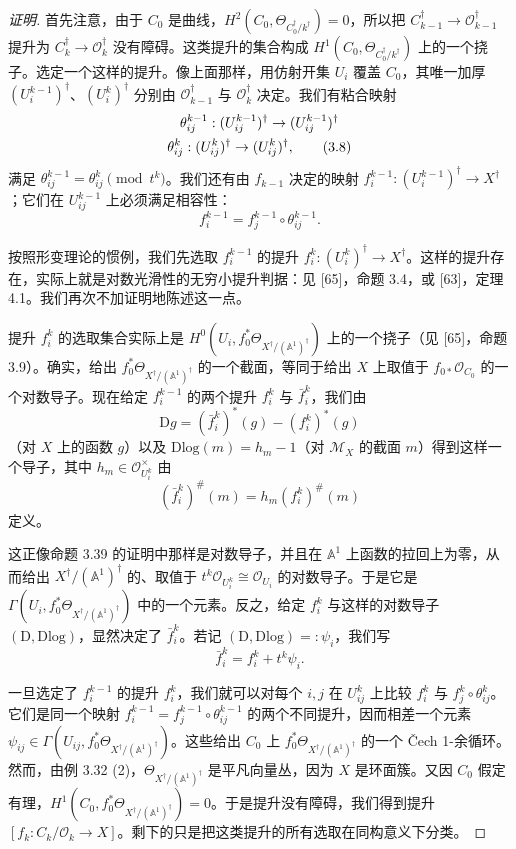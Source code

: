 \begin{proof}[证明]
首先注意，由于 $C_0$ 是曲线，$H^2(C_0,\Theta_{C_0^{\dagger}/k^{\dagger}})=0$，所以把 $C_{k-1}^{\dagger}\to\mathcal{O}_{k-1}^{\dagger}$ 提升为 $C_k^{\dagger}\to\mathcal{O}_k^{\dagger}$ 没有障碍。这类提升的集合构成 $H^1(C_0,\Theta_{C_0^{\dagger}/k^{\dagger}})$ 上的一个挠子。选定一个这样的提升。像上面那样，用仿射开集 $U_i$ 覆盖 $C_0$，其唯一加厚 $(U_i^{k-1})^{\dagger}$、$(U_i^{k})^{\dagger}$ 分别由 $\mathcal{O}_{k-1}^{\dagger}$ 与 $\mathcal{O}_k^{\dagger}$ 决定。我们有粘合映射
\begin{gather}
  \theta_{ij}^{k-1}:(U_{ij}^{k-1})^{\dagger}\to(U_{ij}^{k-1})^{\dagger}\notag\\
  \theta_{ij}^{k}:(U_{ij}^{k})^{\dagger}\to(U_{ij}^{k})^{\dagger}, \tag{3.8}
\end{gather}
满足 $\theta_{ij}^{k-1}=\theta_{ij}^{k}\pmod{t^k}$。我们还有由 $f_{k-1}$ 决定的映射 $f_i^{k-1}:(U_i^{k-1})^{\dagger}\to X^{\dagger}$；它们在 $U_{ij}^{k-1}$ 上必须满足相容性：
\[
  f_i^{k-1}=f_j^{k-1}\circ\theta_{ij}^{k-1}.
\]

按照形变理论的惯例，我们先选取 $f_i^{k-1}$ 的提升 $f_i^{k}:(U_i^{k})^{\dagger}\to X^{\dagger}$。这样的提升存在，实际上就是对数光滑性的无穷小提升判据：见 [65]，命题 3.4，或 [63]，定理 4.1。我们再次不加证明地陈述这一点。

提升 $f_i^{k}$ 的选取集合实际上是 $H^0(U_i,f_0^{*}\Theta_{X^{\dagger}/(\mathbb{A}^1)^{\dagger}})$ 上的一个挠子（见 [65]，命题 3.9）。确实，给出 $f_0^{*}\Theta_{X^{\dagger}/(\mathbb{A}^1)^{\dagger}}$ 的一个截面，等同于给出 $X$ 上取值于 $f_{0*}\mathcal{O}_{C_0}$ 的一个对数导子。现在给定 $f_i^{k-1}$ 的两个提升 $f_i^{k}$ 与 $\bar f_i^{k}$，我们由
\[
  \mathrm{D}g=(\bar f_i^{k})^{*}(g)-(f_i^{k})^{*}(g)
\]
（对 $X$ 上的函数 $g$）以及 $\mathrm{Dlog}(m)=h_m-1$（对 $\mathcal{M}_X$ 的截面 $m$）得到这样一个导子，其中 $h_m\in\mathcal{O}_{U_i^{k}}^{\times}$ 由
\[
  (\bar f_i^{k})^{\#}(m)=h_m(f_i^{k})^{\#}(m)
\]
定义。

这正像命题 3.39 的证明中那样是对数导子，并且在 $\mathbb{A}^1$ 上函数的拉回上为零，从而给出 $X^{\dagger}/(\mathbb{A}^1)^{\dagger}$ 的、取值于 $t^k\mathcal{O}_{U_i^{k}}\cong\mathcal{O}_{U_i}$ 的对数导子。于是它是 $\Gamma(U_i,f_0^{*}\Theta_{X^{\dagger}/(\mathbb{A}^1)^{\dagger}})$ 中的一个元素。反之，给定 $f_i^{k}$ 与这样的对数导子 $(\mathrm{D},\mathrm{Dlog})$，显然决定了 $\bar f_i^{k}$。若记 $(\mathrm{D},\mathrm{Dlog})=:\psi_i$，我们写
\[
  \bar f_i^{k}=f_i^{k}+t^k\psi_i.
\]

一旦选定了 $f_i^{k-1}$ 的提升 $f_i^{k}$，我们就可以对每个 $i,j$ 在 $U_{ij}^{k}$ 上比较 $f_i^{k}$ 与 $f_j^{k}\circ\theta_{ij}^{k}$。它们是同一个映射 $f_i^{k-1}=f_j^{k-1}\circ\theta_{ij}^{k-1}$ 的两个不同提升，因而相差一个元素 $\psi_{ij}\in\Gamma(U_{ij},f_0^{*}\Theta_{X^{\dagger}/(\mathbb{A}^1)^{\dagger}})$。这些给出 $C_0$ 上 $f_0^{*}\Theta_{X^{\dagger}/(\mathbb{A}^1)^{\dagger}}$ 的一个 Čech 1-余循环。然而，由例 3.32 (2)，$\Theta_{X^{\dagger}/(\mathbb{A}^1)^{\dagger}}$ 是平凡向量丛，因为 $X$ 是环面簇。又因 $C_0$ 假定有理，$H^1(C_0,f_0^{*}\Theta_{X^{\dagger}/(\mathbb{A}^1)^{\dagger}})=0$。于是提升没有障碍，我们得到提升 $[f_k:C_k/\mathcal{O}_k\to X]$。剩下的只是把这类提升的所有选取在同构意义下分类。


\end{proof}
